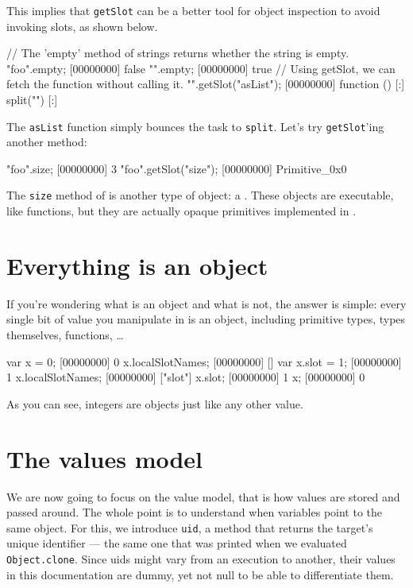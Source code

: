 This implies that \lstinline|getSlot| can be a better tool for object
inspection to avoid invoking slots, as shown below.

\begin{urbiscript}[firstnumber=last]
// The 'empty' method of strings returns whether the string is empty.
"foo".empty;
[00000000] false
"".empty;
[00000000] true
// Using getSlot, we can fetch the function without calling it.
"".getSlot("asList");
[00000000] function () {
[:]  split("")
[:]}
\end{urbiscript}

The \lstinline|asList| function simply bounces the task to
\lstinline|split|.  Let's try \lstinline{getSlot}'ing another method:

\begin{urbiscript}[firstnumber=last]
"foo".size;
[00000000] 3
"foo".getSlot("size");
[00000000] Primitive_0x0
\end{urbiscript}

The \lstinline{size} method of  is another type of
object: a . These objects are executable, like
functions, but they are actually opaque primitives implemented in
\Cxx.

\section{Everything is an object}

If you're wondering what is an object and what is not, the answer is
simple: every single bit of value you manipulate in \us is an
object, including primitive types, types themselves, functions, \ldots

\begin{urbiscript}[firstnumber=last]
var x = 0;
[00000000] 0
x.localSlotNames;
[00000000] []
var x.slot = 1;
[00000000] 1
x.localSlotNames;
[00000000] ["slot"]
x.slot;
[00000000] 1
x;
[00000000] 0
\end{urbiscript}

As you can see, integers are objects just like any other value.

\section{The \us values model}

We are now going to focus on the \us value model, that is how values
are stored and passed around. The whole point is to understand when
variables point to the same object.  For this, we introduce
\lstinline{uid}, a method that returns the target's unique identifier
--- the same one that was printed when we evaluated
\lstinline|Object.clone|.  Since uids might vary from an execution to
another, their values in this documentation are dummy, yet not null to
be able to differentiate them.

